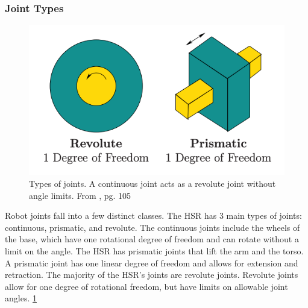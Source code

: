 \documentclass[11pt]{article}
\begin{document}
        \subsubsection{Joint Types}
            \begin{figure}[ht]
                \includegraphics[width=\linewidth]{screenshots/LaValle_joints}
                \centering
                \caption{Types of joints. A continuous joint acts as a revolute joint without angle limits. From \cite{lavalle_planning_2006}, pg. 105}
                \label{fig:joints_image}
            \end{figure}
            Robot joints fall into a few distinct classes. The HSR has 3 main types of joints: continuous, prismatic, and revolute. The continuous joints include the wheels of the base, which have one rotational degree of freedom and can rotate without a limit on the angle. The HSR has prismatic joints that lift the arm and the torso. A prismatic joint has one linear degree of freedom and allows for extension and retraction. The majority of the HSR's joints are revolute joints. Revolute joints allow for one degree of rotational freedom, but have limits on allowable joint angles.\cite{lavalle_planning_2006} \cref{fig:joints_image}
\end{document}
